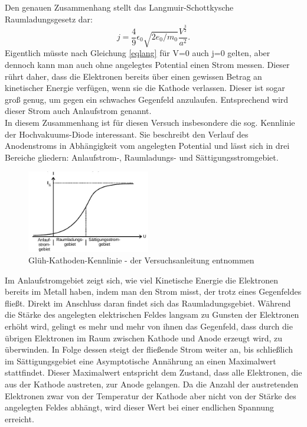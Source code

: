 Den genauen Zusammenhang stellt das Langmuir-Schottkysche Raumladungsgesetz dar:
\begin{equation}
j=\frac{4}{9}\epsilon_0 \sqrt{2e_0/m_0} \frac{V^\frac{3}{2}}{a^2}.
\label{eqlang}
\end{equation}
Eigentlich müsste nach Gleichung \eqref{eqlang} für V=0 auch j=0 gelten, aber dennoch kann man auch ohne angelegtes Potential einen Strom messen. Dieser rührt daher, dass  die Elektronen bereits über einen gewissen Betrag an kinetischer Energie verfügen, wenn sie die Kathode verlassen. Dieser ist sogar groß genug, um gegen ein schwaches Gegenfeld anzulaufen. Entsprechend wird dieser Strom auch Anlaufstrom genannt.\\
In diesem Zusammenhang ist für diesen Versuch insbesondere die sog. Kennlinie der Hochvakuums-Diode interessant. Sie beschreibt den Verlauf des Anodenstroms in Abhängigkeit vom angelegten Potential und lässt sich in drei Bereiche gliedern:  Anlaufstrom-, Raumladungs- und Sättigungsstromgebiet.
\begin{figure}[H]
\includegraphics[width=0.479\textwidth]{pics/kennlinie.jpg}
\caption{Glüh-Kathoden-Kennlinie - der Versuchsanleitung entnommen}
\label{pic_kennlinie}
\end{figure}
Im Anlaufstromgebiet zeigt sich, wie viel Kinetische Energie die Elektronen bereits im Metall haben, indem man den Strom misst, der trotz eines Gegenfeldes fließt. Direkt im Anschluss daran findet sich das Raumladungsgebiet. Während die Stärke des angelegten elektrischen Feldes langsam zu Gunsten der Elektronen erhöht wird, gelingt es mehr und mehr von ihnen das Gegenfeld, dass durch die übrigen Elektronen im Raum zwischen Kathode und Anode erzeugt wird, zu überwinden. In Folge dessen steigt der fließende Strom weiter an, bis schließlich im Sättigungsgebiet eine Asymptotische Annährung an einen Maximalwert stattfindet. Dieser Maximalwert entspricht dem Zustand, dass alle Elektronen, die aus der Kathode austreten, zur Anode gelangen. Da die Anzahl der austretenden Elektronen zwar von der Temperatur der Kathode aber nicht von der Stärke des angelegten Feldes abhängt, wird dieser Wert bei einer endlichen Spannung erreicht. 

